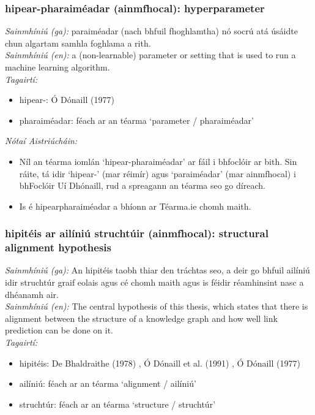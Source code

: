 \documentclass{article}
\begin{document}
\subsubsection*{hipear-pharaiméadar (ainmfhocal): hyperparameter}
 \noindent \textit{Sainmhíniú (ga):} paraiméadar (nach bhfuil fhoghlamtha) nó socrú atá úsáidte chun algartam samhla foghlama a rith.
\\
 \noindent \textit{Sainmhíniú (en):} a (non-learnable) parameter or setting that is used to run a machine learning algorithm.
\\
 \noindent \textit{Tagairtí:}
\begin{itemize}
	\item hipear-: Ó Dónaill (1977) \cite{odonaill}
	\item pharaiméadar: féach ar an téarma `parameter / pharaiméadar'
\end{itemize}

 \noindent \textit{Nótaí Aistriúcháin:}
\begin{itemize}
	\item Níl an téarma iomlán `hipear-pharaiméadar' ar fáil i bhfoclóir ar bith. Sin ráite, tá idir `hipear-' (mar réimír) agus `paraiméadar' (mar ainmfhocal) i bhFoclóir Uí Dhónaill, rud a spreagann an téarma seo go díreach.
	\item Is é hipearpharaiméadar a bhíonn ar Téarma.ie chomh maith.
\end{itemize}


\subsubsection*{hipitéis ar ailíniú struchtúir (ainmfhocal): structural alignment hypothesis}
 \noindent \textit{Sainmhíniú (ga):} An hipitéis taobh thiar den tráchtas seo, a deir go bhfuil ailíniú idir struchtúr graif eolais agus cé chomh maith agus is féidir réamhinsint nasc a dhéanamh air.
\\
 \noindent \textit{Sainmhíniú (en):} The central hypothesis of this thesis, which states that there is alignment between the structure of a knowledge graph and how well link prediction can be done on it.
\\
 \noindent \textit{Tagairtí:}
\begin{itemize}
	\item hipitéis: De Bhaldraithe (1978) \cite{de-bhaldraithe}, Ó Dónaill et al. (1991) \cite{focloir-beag}, Ó Dónaill (1977) \cite{odonaill}
	\item ailíniú: féach ar an téarma `alignment / ailíniú'
	\item struchtúr: féach ar an téarma `structure / struchtúr'
\end{itemize}
\end{document}
